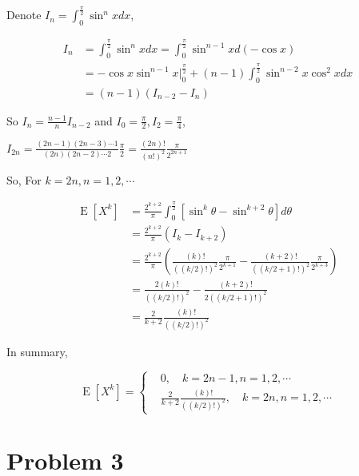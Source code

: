 \documentclass{article}
\begin{document}
Denote $I_n = \int_{0}^{\frac \pi {2}} \sin^n x dx$,

\begin{equation}
    \begin{aligned}
        I_{n} & =  \int_{0}^{\frac \pi {2}} \sin^n x dx =  \int_{0}^{\frac \pi {2}} \sin^{n-1} x d(-\cos x) \\
        & = -\cos x\sin^{n-1} x \big|_{0}^{\frac \pi {2}} + (n-1)  \int_{0}^{\frac \pi {2}} \sin^{n-2}x\cos^2 x dx \\
        & = (n-1)(I_{n-2}-I_n)
    \end{aligned}
\end{equation}

So $I_n = \frac{n-1}{n} I_{n-2}$ and $I_0 = \frac{\pi}{2},I_2 = \frac{\pi}{4}$, 

$I_{2n}= \frac{(2n-1)(2n-3)\cdots 1}{(2n)(2n-2)\cdots 2} \frac {\pi} {2} = \frac {(2n)!} {(n!)^2 } \frac{\pi}{ 2^{2n+1}}$

So, For $k=2n,n=1,2,\cdots$


\begin{equation}
    \begin{aligned}
        \operatorname{E}[X^k] & =  \frac {2^{k+2}}{\pi}\int_{0}^{\frac \pi {2}} \left[\sin^k\theta  - \sin^{k+2}\theta \right] d\theta \\ 
        & = \frac {2^{k+2}}{\pi} \left(I_k - I_{k+2}\right) \\
        & = \frac {2^{k+2}}{\pi} \left( \frac {(k)!} {((k/2)!)^2 } \frac{\pi}{ 2^{k+1}} - \frac {(k+2)!} {((k/2+1)!)^2 } \frac{\pi}{ 2^{k+3}} \right) \\
        & = \frac {2(k)!} {((k/2)!)^2 } - \frac {(k+2)!} {2((k/2+1)!)^2 } \\
        & = \frac{2}{k+2} \frac {(k)!} {((k/2)!)^2 }
    \end{aligned}
\end{equation}


In summary,

\begin{equation}
    \operatorname{E}[X^k] = \left\{
    \begin{aligned}
        &0, \quad k=2n-1,n=1,2,\cdots \\
        &\frac{2}{k+2} \frac {(k)!} {((k/2)!)^2 }, \quad k=2n,n=1,2,\cdots
    \end{aligned}
    \right.
\end{equation}

\section{Problem 3}
\end{document}
